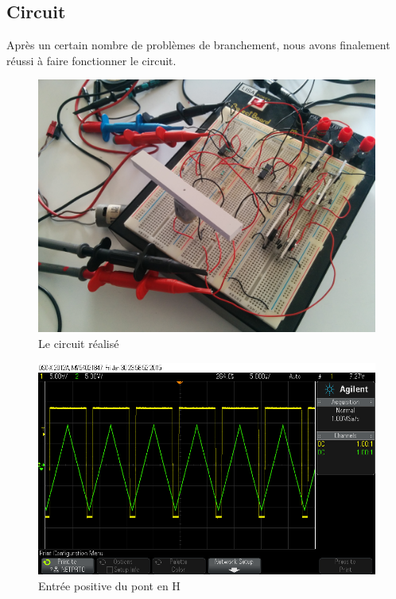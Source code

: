 \documentclass[a4paper]{article}
\begin{document}
\subsection{Circuit}

Après un certain nombre de problèmes de branchement, nous avons finalement réussi à faire fonctionner le circuit.

\begin{figure}[H]
  \centering
    \includegraphics[width=1\textwidth]{circuit}
  \caption{Le circuit réalisé}
\end{figure}


\begin{figure}[H]
  \centering
    \includegraphics[width=1\textwidth]{scope_1}
  \caption{Entrée positive du pont en H}
\end{figure}
\end{document}
